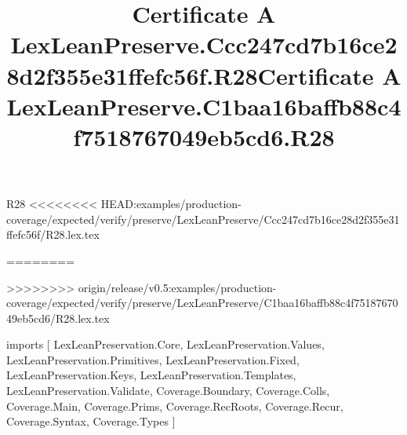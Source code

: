 \begin{lexlean}{R28}
<<<<<<<< HEAD:examples/production-coverage/expected/verify/preserve/LexLeanPreserve/Ccc247cd7b16ce28d2f355e31ffefc56f/R28.lex.tex
\title{Certificate A LexLeanPreserve.Ccc247cd7b16ce28d2f355e31ffefc56f.R28}
========
\title{Certificate A LexLeanPreserve.C1baa16baffb88c4f7518767049eb5cd6.R28}
>>>>>>>> origin/release/v0.5:examples/production-coverage/expected/verify/preserve/LexLeanPreserve/C1baa16baffb88c4f7518767049eb5cd6/R28.lex.tex
\begin{coremodule}
imports [
  LexLeanPreservation.Core,
  LexLeanPreservation.Values,
  LexLeanPreservation.Primitives,
  LexLeanPreservation.Fixed,
  LexLeanPreservation.Keys,
  LexLeanPreservation.Templates,
  LexLeanPreservation.Validate,
  Coverage.Boundary,
  Coverage.Colls,
  Coverage.Main,
  Coverage.Prims,
  Coverage.RecRoots,
  Coverage.Recur,
  Coverage.Syntax,
  Coverage.Types
]


\end{coremodule}
\end{lexlean}
